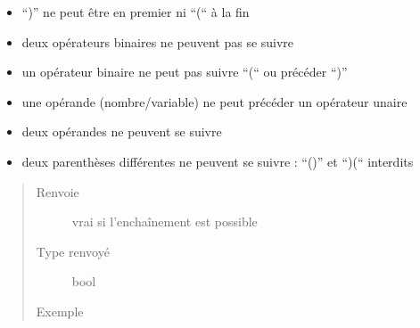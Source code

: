 \documentclass[letterpaper,10pt,french]{sphinxmanual}
\begin{document}
\begin{fulllineitems}
\begin{fulllineitems}
\begin{itemize}
\item {} 
“)” ne peut être en premier ni “(“ à la fin

\item {} 
deux opérateurs binaires ne peuvent pas se suivre

\item {} 
un opérateur binaire ne peut pas suivre “(“ ou précéder “)”

\item {} 
une opérande (nombre/variable) ne peut précéder un opérateur unaire

\item {} 
deux opérandes ne peuvent se suivre

\item {} 
deux parenthèses différentes ne peuvent se suivre : “()” et “)(“ interdits

\end{itemize}
\begin{quote}\begin{description}
\item[{Renvoie}] \leavevmode
vrai si l’enchaînement est possible

\item[{Type renvoyé}] \leavevmode
bool

\item[{Exemple}] \leavevmode
\begin{sphinxVerbatim}[commandchars=\\\{\}]
 
 
 
 
\end{sphinxVerbatim}


\end{description}
\end{quote}
\end{fulllineitems}
\end{fulllineitems}
\end{document}
